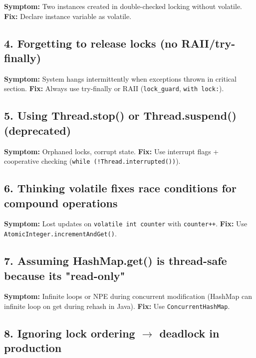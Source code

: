 \documentclass[11pt]{article}
\begin{document}
\textbf{Symptom:} Two instances created in double-checked locking without volatile. \textbf{Fix:} Declare instance variable as volatile.

\subsection{4. Forgetting to release locks (no RAII/try-finally)}\label{4-forgetting-to-release-locks-no-raiitry-finally}

\textbf{Symptom:} System hangs intermittently when exceptions thrown in critical section. \textbf{Fix:} Always use try-finally or RAII (\texttt{lock\_guard}, \texttt{with\ lock:}).

\subsection{5. Using Thread.stop() or Thread.suspend() (deprecated)}\label{5-using-threadstop-or-threadsuspend-deprecated}

\textbf{Symptom:} Orphaned locks, corrupt state. \textbf{Fix:} Use interrupt flags + cooperative checking (\texttt{while\ (!Thread.interrupted())}).

\subsection{6. Thinking volatile fixes race conditions for compound operations}\label{6-thinking-volatile-fixes-race-conditions-for-compound-operations}

\textbf{Symptom:} Lost updates on \texttt{volatile\ int\ counter} with \texttt{counter++}. \textbf{Fix:} Use \texttt{AtomicInteger.incrementAndGet()}.

\subsection{7. Assuming HashMap.get() is thread-safe because it\textquotesingle s "read-only"}\label{7-assuming-hashmapget-is-thread-safe-because-its-read-only}

\textbf{Symptom:} Infinite loops or NPE during concurrent modification (HashMap can infinite loop on get during rehash in Java). \textbf{Fix:} Use \texttt{ConcurrentHashMap}.

\subsection{\texorpdfstring{8. Ignoring lock ordering \(\rightarrow\) deadlock in production}{8. Ignoring lock ordering \textbackslash rightarrow deadlock in production}}\label{8-ignoring-lock-ordering-rightarrow-deadlock-in-production}
\end{document}
